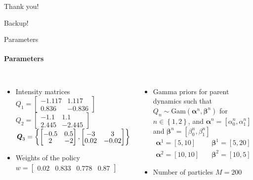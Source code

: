 \documentclass[
english,%
aspectratio=169,%
color={accentcolor=3b},
logo=true,%
colorframetitle=false,%
]{tudabeamer}
\begin{document}
\begin{frame}[c]{}
\centering \Huge
Thank you!
\end{frame}


\begin{frame}[c]{}
\centering \Huge
Backup!
\end{frame}

\begin{frame}{Parameters}
\framesubtitle{Parameters}
\begin{columns}[T]
\begin{itemize}
\item Intensity matrices \vspace{+4pt}\\
$ Q_1 = 
\begin{bmatrix}
-1.117 & 1.117 \\
0.836 &  -0.836
\end{bmatrix} $\\
\vspace{+3pt}
$ Q_2 = 
\begin{bmatrix}
-1.1 & 1.1 \\
2.445 &  -2.445
\end{bmatrix}$\\
\vspace{+3pt}
$\textbf{\textit{Q}}_{3} = \left\lbrace 
\begin{bmatrix}\vspace{-2pt}
-0.5 & 0.5 \\\vspace{-2pt}
2 &  -2
\end{bmatrix}, 
\begin{bmatrix}\vspace{-2pt}
-3 & 3 \\\vspace{-2pt}
0.02 &  -0.02
\end{bmatrix} 
\right\rbrace $
\item Weights of the policy \vspace{+4pt} \\ $  w = \begin{bmatrix}0.02 & 0.833& 0.778& 0.87 \end{bmatrix}$
\end{itemize}
\begin{itemize}
\item Gamma priors for parent dynamics such that $ Q_{n} \sim \mathrm{Gam}(\boldsymbol{\alpha}^n, \boldsymbol{\beta}^n)$ for $n \in \left\lbrace 1,2\right\rbrace $, and $ \boldsymbol{\alpha}^n = [\alpha^n_0, \alpha^n_1] $ and $ \boldsymbol{\beta}^n = [\beta^n_0, \beta^n_1] $
\begin{align}
\boldsymbol{\alpha}^1 = [5,10] &\quad \boldsymbol{\beta}^1 = [5,20] \nonumber\\
\boldsymbol{\alpha}^2 = [10,10] &\quad \boldsymbol{\beta}^2 = [10,5] \nonumber
\end{align}
\item Number of particles $ M = 200 $
\end{itemize}
\end{columns}
\end{frame}
\end{document}
